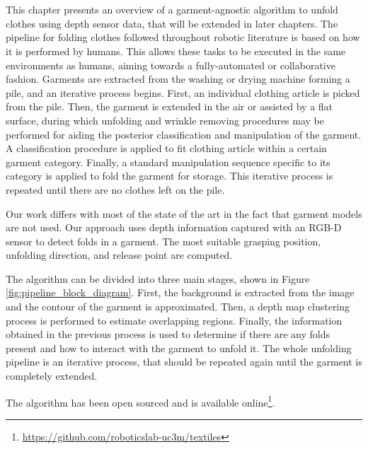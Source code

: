 \chapter{\MyTitle}
\label{architecture}

This chapter presents an overview of a garment-agnostic algorithm to unfold clothes using depth sensor data, that will be extended in later chapters. The pipeline for folding clothes followed throughout robotic literature is based on how it is performed by humans. This allows these tasks to be executed in the same environments as humans, aiming towards a fully-automated or collaborative fashion. Garments are extracted from the washing or drying machine forming a pile, and an iterative process begins. First, an individual clothing article is picked from the pile. Then, the garment is extended in the air or assisted by a flat surface, during which unfolding and wrinkle removing procedures may be performed for aiding the posterior classification and manipulation of the garment. A classification procedure is applied to fit clothing article within a certain garment category. Finally, a standard manipulation sequence specific to its category is applied to fold the garment for storage. This iterative process is repeated until there are no clothes left on the pile.

Our work differs with most of the state of the art in the fact that garment models are not used. Our approach uses depth information captured with an RGB-D sensor to detect folds in a garment. The most suitable grasping position, unfolding direction, and release point are computed.

The algorithm can be divided into three main stages, shown in Figure \ref{fig:pipeline_block_diagram}. First, the  background is extracted from the image and the contour of the garment is approximated. Then, a depth map clustering process is performed to estimate overlapping regions. Finally, the information obtained in the previous process is used to determine if there are any folds present and how to interact with the garment to unfold it. The whole unfolding pipeline is an iterative process, that should be repeated again until the garment is completely extended.

The algorithm has been open sourced and is available online\footnote{\url{https://github.com/roboticslab-uc3m/textiles}}.

